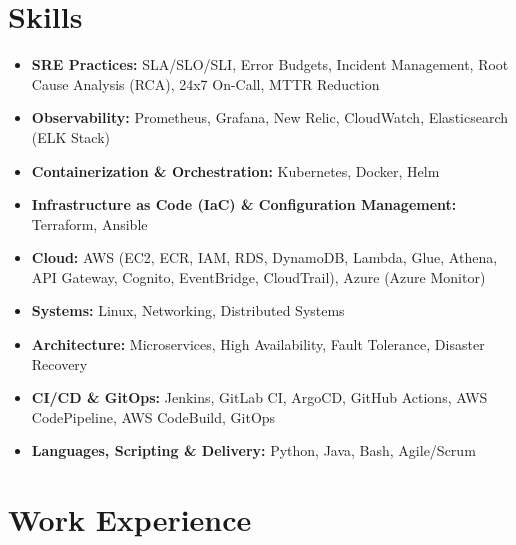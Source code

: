 \documentclass[a4paper,10.999999pt]{article}
\begin{document}
    \section{Skills}
    \begin{itemize}[leftmargin=1.35em, itemsep=0.35pt, topsep=0.3pt, parsep=0pt, label=\raisebox{0.25ex}{\tiny$\circ$}]
    \item \textbf{SRE Practices:} SLA/SLO/SLI, Error Budgets, Incident Management, Root Cause Analysis (RCA), 24x7 On-Call, MTTR Reduction
    \item \textbf{Observability:} Prometheus, Grafana, New Relic, CloudWatch, Elasticsearch (ELK Stack)
    \item \textbf{Containerization \& Orchestration:} Kubernetes, Docker, Helm
    \item \textbf{Infrastructure as Code (IaC) \& Configuration Management:} Terraform, Ansible
    \item \textbf{Cloud:} AWS (EC2, ECR, IAM, RDS, DynamoDB, Lambda, Glue, Athena, API Gateway, Cognito, EventBridge, CloudTrail), Azure (Azure Monitor)
    \item \textbf{Systems:} Linux, Networking, Distributed Systems
    \item \textbf{Architecture:} Microservices, High Availability, Fault Tolerance, Disaster Recovery
    \item \textbf{CI/CD \& GitOps:} Jenkins, GitLab CI, ArgoCD, GitHub Actions, AWS CodePipeline, AWS CodeBuild, GitOps
    \item \textbf{Languages, Scripting \& Delivery:} Python, Java, Bash, Agile/Scrum
    \end{itemize}


    \section{Work Experience}
\end{document}
